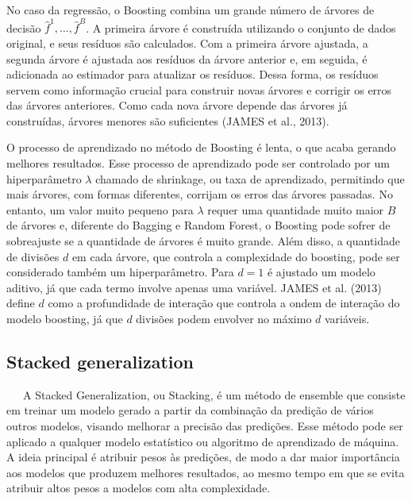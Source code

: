 \documentclass[
  12pt,
  a4paper,
]{scrreprt}
\begin{document}
\vspace{12pt}

No caso da regressão, o Boosting combina um grande número de árvores de
decisão \(\hat{f}^1, \dots, \hat{f}^B\). A primeira árvore é construída
utilizando o conjunto de dados original, e seus resíduos são calculados.
Com a primeira árvore ajustada, a segunda árvore é ajustada aos resíduos
da árvore anterior e, em seguida, é adicionada ao estimador para
atualizar os resíduos. Dessa forma, os resíduos servem como informação
crucial para construir novas árvores e corrigir os erros das árvores
anteriores. Como cada nova árvore depende das árvores já construídas,
árvores menores são suficientes (JAMES et al., 2013).

\vspace{12pt}

O processo de aprendizado no método de Boosting é lenta, o que acaba
gerando melhores resultados. Esse processo de aprendizado pode ser
controlado por um hiperparâmetro \(\lambda\) chamado de shrinkage, ou
taxa de aprendizado, permitindo que mais árvores, com formas diferentes,
corrijam os erros das árvores passadas. No entanto, um valor muito
pequeno para \(\lambda\) requer uma quantidade muito maior \(B\) de
árvores e, diferente do Bagging e Random Forest, o Boosting pode sofrer
de sobreajuste se a quantidade de árvores é muito grande. Além disso, a
quantidade de divisões \(d\) em cada árvore, que controla a complexidade
do boosting, pode ser considerado também um hiperparâmetro. Para
\(d = 1\) é ajustado um modelo aditivo, já que cada termo involve apenas
uma variável. JAMES et al. (2013) define \(d\) como a profundidade de
interação que controla a ondem de interação do modelo boosting, já que
\(d\) divisões podem envolver no máximo \(d\) variáveis.

\subsection{Stacked generalization}\label{stacked-generalization}

~~~A Stacked Generalization, ou Stacking, é um método de ensemble que
consiste em treinar um modelo gerado a partir da combinação da predição
de vários outros modelos, visando melhorar a precisão das predições.
Esse método pode ser aplicado a qualquer modelo estatístico ou algoritmo
de aprendizado de máquina. A ideia principal é atribuir pesos às
predições, de modo a dar maior importância aos modelos que produzem
melhores resultados, ao mesmo tempo em que se evita atribuir altos pesos
a modelos com alta complexidade.
\end{document}
